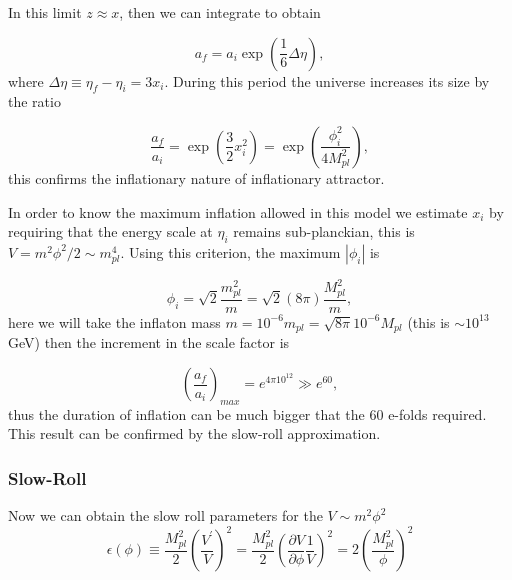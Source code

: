 \documentclass[12pt,letterpaper,twoside]{book}
\begin{document}
In this limit $z\approx x$, then we can integrate to obtain

\begin{equation}
a_f = a_i \exp \left(\frac{1}{6} \Delta \eta \right),
\end{equation}
where $\Delta \eta \equiv \eta_f - \eta_i=3x_i$. During this period the
universe increases its size by the ratio

\begin{equation}
\frac{a_f }{a_i} = \exp \left( \frac{3}{2} x_i^2\right) =
                   \exp \left( \frac{\phi_i^2}{4 M_{pl}^2}\right),
\end{equation}
this confirms the inflationary nature of inflationary attractor.

In order to know the maximum inflation allowed in this model we estimate $x_i$
by requiring that the energy scale at $\eta_i$ remains sub-planckian, this is $V=m^2
\phi^2/2 \sim m_{pl}^4$. Using this criterion, the maximum $|\phi_i|$ is

\begin{equation}
\phi_i = \sqrt{2} \frac{m_{pl}^2}{m }= \sqrt{2} (8 \pi) \frac{M_{pl}^2}{m},
\end{equation}
here we will take the inflaton mass $m=10^{-6}m_{pl}=\sqrt{8\pi} 10^{-6}M_{pl}$
(this is $\sim 10^{13}$GeV) then the increment in the scale factor is

\begin{equation}
\boxed{\left(\frac{a_f }{a_i} \right)_{max} = e^{ 4\pi 10^{12}} \gg e^{60} },
\end{equation}
thus the duration of inflation can be much bigger that the $60$ e-folds
required. This result can be confirmed by the slow-roll approximation.

\subsubsection{Slow-Roll}


Now we can obtain the slow roll parameters for the $V\sim m^2\phi^2$
 \begin{equation}
    \epsilon  \left(\phi\right)\equiv \frac{M_{pl}^2}{2} \left(\frac{V^\prime}{V}\right)^2
             = \frac{ M_{pl}^2}{2} \left( \frac{\partial V}{\partial \phi} \frac{1}{V}\right)^2
             = 2 \left( \frac{ M_{pl}^2 }{ \phi } \right)^2
\end{equation}
\end{document}
